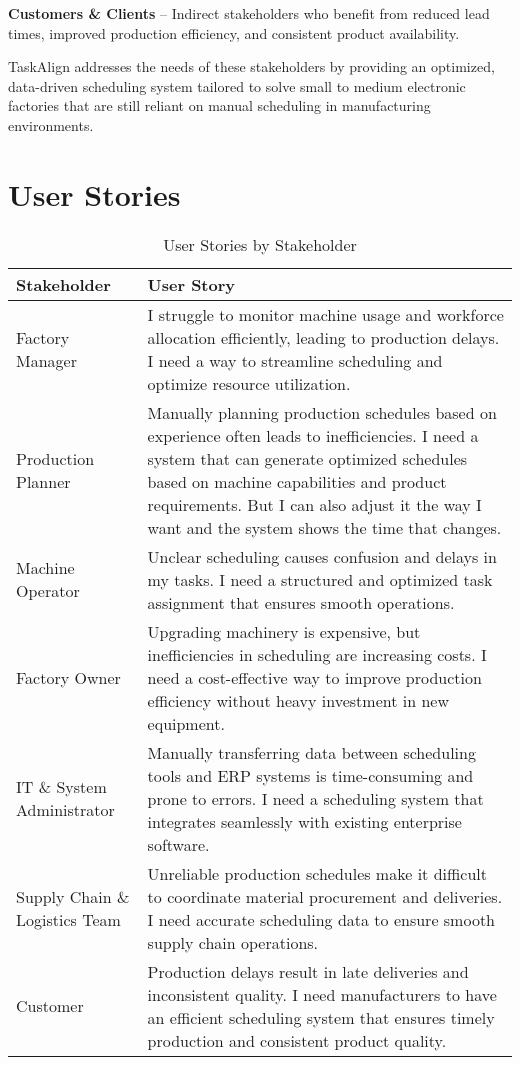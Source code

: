 \textbf{Customers \& Clients} – Indirect stakeholders who benefit from reduced lead times, improved production efficiency, and consistent product availability.

TaskAlign addresses the needs of these stakeholders by providing an optimized, data-driven scheduling system tailored to solve small to medium electronic factories that are still reliant on manual scheduling in manufacturing environments.


\section{User Stories}
\label{section:user-stories}


\begin{table}[!h]
    \begin{adjustwidth}{-.85in}{-.85in}
        \noindent
        \centering
        \small\begin{tabularx}{1.3\textwidth}{|>{\columncolor{yellow!20}\raggedright\arraybackslash}p{2.5cm}|X|}
            \hline
            \textbf{Stakeholder} & \textbf{User Story} \\\hline
            Factory Manager & I struggle to monitor machine usage and workforce allocation efficiently, leading to production delays. I need a way to streamline scheduling and optimize resource utilization. \\\hline
            Production Planner & Manually planning production schedules based on experience often leads to inefficiencies. I need a system that can generate optimized schedules based on machine capabilities and product requirements. But I can also adjust it the way I want and the system shows the time that changes. \\\hline
            Machine Operator & Unclear scheduling causes confusion and delays in my tasks. I need a structured and optimized task assignment that ensures smooth operations. \\\hline
            Factory Owner & Upgrading machinery is expensive, but inefficiencies in scheduling are increasing costs. I need a cost-effective way to improve production efficiency without heavy investment in new equipment. \\\hline
            IT \& System Administrator & Manually transferring data between scheduling tools and ERP systems is time-consuming and prone to errors. I need a scheduling system that integrates seamlessly with existing enterprise software. \\\hline
            Supply Chain \& Logistics Team & Unreliable production schedules make it difficult to coordinate material procurement and deliveries. I need accurate scheduling data to ensure smooth supply chain operations. \\\hline
            Customer & Production delays result in late deliveries and inconsistent quality. I need manufacturers to have an efficient scheduling system that ensures timely production and consistent product quality. \\\hline
        \end{tabularx}
    \end{adjustwidth}
    \caption{User Stories by Stakeholder}
\end{table}
